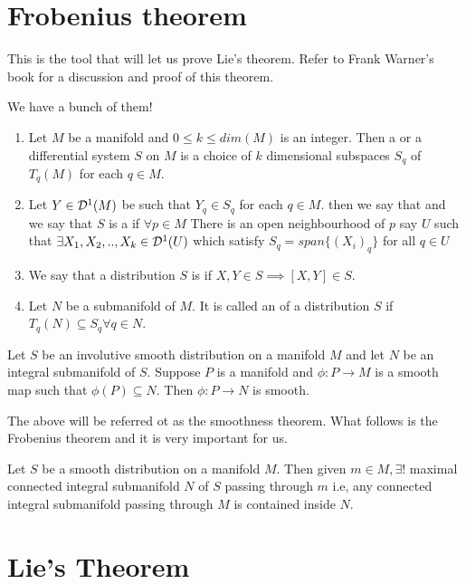 \documentclass{article}
\begin{document}
\section*{Frobenius theorem}
    This is the tool that will let us prove Lie's theorem. Refer to Frank Warner's book for a discussion and proof of this theorem.
\begin{definition}
    We have a bunch of them!
    \begin{enumerate}
        \item  Let $M$ be a manifold and $0\leq k\leq dim(M)$ is an integer. Then a  or a differential system $S$ on $M$ is a choice of 
        $k$ dimensional subspaces $S_q$ of $T_q(M)$ for each $q\in M$. 
        \item Let $Y\in \mathcal{D}^1(M)$ be such that $Y_q\in S_q$ for each $q\in M$. then we say that  and we say that $S$ is a  if $\forall p\in M$
        There is an open neighbourhood of $p$ say $U$ such that $\exists X_1,X_2,..,X_k\in \mathcal{D}^1(U)$ which satisfy $S_q=span\{(X_i)_q\}$ for all $q\in U$
        \item We say that a distribution $S$ is  if $X,Y\in S\implies [X,Y]\in S$.
        \item Let $N$ be a submanifold of $M$. It is called an  of a distribution $S$ if $T_q(N)\subseteq S_q\forall q\in N$.  
    \end{enumerate}
\end{definition}

\begin{theorem}
    Let $S$ be an involutive smooth distribution on a manifold $M$ and let $N$ be an integral submanifold of $S$. Suppose $P$ is a manifold and $\phi:P\to M$ is a smooth map such that $\phi(P)\subseteq N$. Then $\phi:P\to N$ is smooth.
\end{theorem}

The above will be referred ot as the smoothness theorem. What follows is the Frobenius theorem and it is very important for us.

\begin{theorem}
    Let $S$ be a smooth distribution on a manifold $M$. Then given $m\in M,\exists !$ maximal connected integral submanifold $N$ of $S$ passing through $m$ i.e, any connected integral submanifold passing through $M$ is contained inside $N$.
\end{theorem}

\section*{Lie's Theorem}
\end{document}
